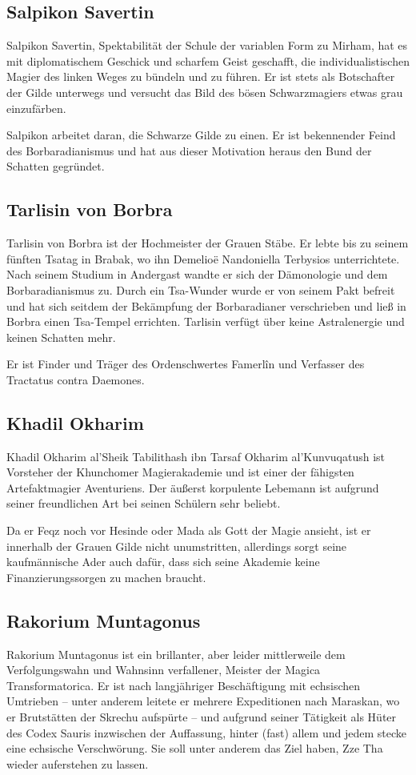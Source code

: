 \subsection{Salpikon Savertin}
Salpikon Savertin, Spektabilität der Schule der variablen Form zu Mirham, hat es mit diplomatischem Geschick und scharfem Geist geschafft, die individualistischen Magier des linken Weges zu bündeln und zu führen. Er ist stets als Botschafter der Gilde unterwegs und versucht das Bild des bösen Schwarzmagiers etwas grau einzufärben.

Salpikon arbeitet daran, die Schwarze Gilde zu einen. Er ist bekennender Feind des Borbaradianismus und hat aus dieser Motivation heraus den Bund der Schatten gegründet. 

\subsection{Tarlisin von Borbra}
Tarlisin von Borbra ist der Hochmeister der Grauen Stäbe. Er lebte bis zu seinem fünften Tsatag in Brabak, wo ihn Demelioë Nandoniella Terbysios unterrichtete. Nach seinem Studium in Andergast wandte er sich der Dämonologie und dem Borbaradianismus zu. Durch ein Tsa-Wunder wurde er von seinem Pakt befreit und hat sich seitdem der Bekämpfung der Borbaradianer verschrieben und ließ in Borbra einen Tsa-Tempel errichten. Tarlisin verfügt über keine Astralenergie und keinen Schatten mehr.

Er ist Finder und Träger des Ordenschwertes Famerlîn und Verfasser des Tractatus contra Daemones. 

\subsection{Khadil Okharim}
Khadil Okharim al'Sheik Tabilithash ibn Tarsaf Okharim al'Kunvuqatush ist Vorsteher der Khunchomer Magierakademie und ist einer der fähigsten Artefaktmagier Aventuriens. Der äußerst korpulente Lebemann ist aufgrund seiner freundlichen Art bei seinen Schülern sehr beliebt.

Da er Feqz noch vor Hesinde oder Mada als Gott der Magie ansieht, ist er innerhalb der Grauen Gilde nicht unumstritten, allerdings sorgt seine kaufmännische Ader auch dafür, dass sich seine Akademie keine Finanzierungssorgen zu machen braucht. 

\subsection{Rakorium Muntagonus}
Rakorium Muntagonus ist ein brillanter, aber leider mittlerweile dem Verfolgungswahn und Wahnsinn verfallener, Meister der Magica Transformatorica. Er ist nach langjähriger Beschäftigung mit echsischen Umtrieben – unter anderem leitete er mehrere Expeditionen nach Maraskan, wo er Brutstätten der Skrechu aufspürte – und aufgrund seiner Tätigkeit als Hüter des Codex Sauris inzwischen der Auffassung, hinter (fast) allem und jedem stecke eine echsische Verschwörung. Sie soll unter anderem das Ziel haben, Zze Tha wieder auferstehen zu lassen. 

